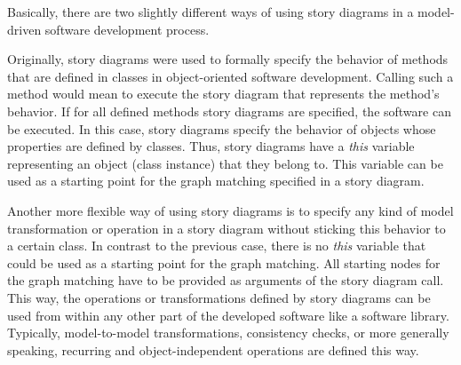 
Basically, there are two slightly different ways of using story diagrams in a model-driven software development process.

Originally, story diagrams were used to formally specify the behavior of methods that are defined in classes in object-oriented software development.
Calling such a method would mean to execute the story diagram that represents the method's behavior.
If for all defined methods story diagrams are specified, the software can be executed.
In this case, story diagrams specify the behavior of objects whose properties are defined by classes.
Thus, story diagrams have a \emph{this} variable representing an object (class instance) that they belong to.
This variable can be used as a starting point for the graph matching specified in a story diagram.

Another more flexible way of using story diagrams is to specify any kind of model transformation or operation in a story diagram without sticking this behavior to a certain class.
In contrast to the previous case, there is no \emph{this} variable that could be used as a starting point for the graph matching.
All starting nodes for the graph matching have to be provided as arguments of the story diagram call.
This way, the operations or transformations defined by story diagrams can be used from within any other part of the developed software like a software library.
Typically, model-to-model transformations, consistency checks, or more generally speaking, recurring and object-independent operations are defined this way.



